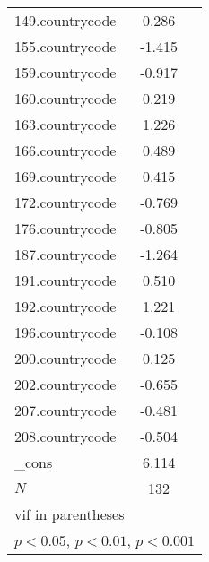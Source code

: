{\begin{tabular}{l*{1}{cc}}
149.countrycode&       0.286         &            \\
155.countrycode&      -1.415\sym{***}&            \\
159.countrycode&      -0.917\sym{***}&            \\
160.countrycode&       0.219         &            \\
163.countrycode&       1.226\sym{**} &            \\
166.countrycode&       0.489         &            \\
169.countrycode&       0.415         &            \\
172.countrycode&      -0.769         &            \\
176.countrycode&      -0.805         &            \\
187.countrycode&      -1.264\sym{***}&            \\
191.countrycode&       0.510\sym{*}  &            \\
192.countrycode&       1.221\sym{**} &            \\
196.countrycode&      -0.108         &            \\
200.countrycode&       0.125         &            \\
202.countrycode&      -0.655\sym{*}  &            \\
207.countrycode&      -0.481         &            \\
208.countrycode&      -0.504         &            \\
\_cons      &       6.114\sym{***}&            \\
\hline
\(N\)       &         132         &            \\
\hline\hline
\multicolumn{3}{l}{\footnotesize vif in parentheses}\\
\multicolumn{3}{l}{\footnotesize \sym{*} \(p<0.05\), \sym{**} \(p<0.01\), \sym{***} \(p<0.001\)}\\
\end{tabular}
}
